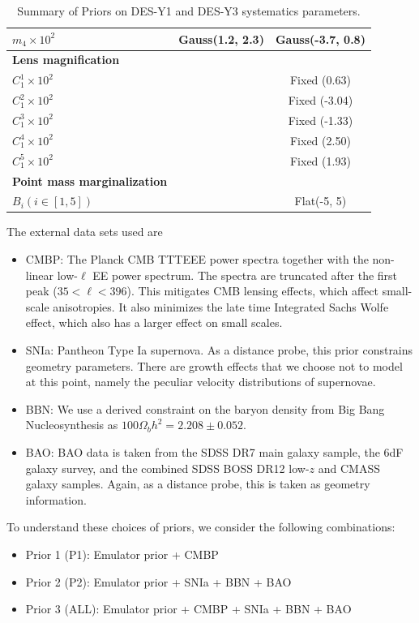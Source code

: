 \begin{table}
\begin{tabular}{lcc}
$m_{4} \times 10^2$ & Gauss(1.2, 2.3) & Gauss(-3.7, 0.8)\\
\hline
\textbf{Lens magnification} \\
$C_{\mathrm{1}}^1 \times 10^2$ & & Fixed (0.63)\\
$C_{\mathrm{1}}^2 \times 10^2$ & & Fixed (-3.04)\\
$C_{\mathrm{1}}^3 \times 10^2$ & & Fixed (-1.33)\\
$C_{\mathrm{1}}^4 \times 10^2$ & & Fixed (2.50)\\
$C_{\mathrm{1}}^5 \times 10^2$ & & Fixed (1.93)\\
\hline
\textbf{Point mass marginalization} \\
$B_i(i \in [1,5])$ & & Flat(-5, 5) \\
\hline
\end{tabular}
\caption{Summary of Priors on DES-Y1 and DES-Y3 systematics parameters.}
\label{table:prior_choices}
\end{table}
The external data sets used are
\begin{itemize}
	\item CMBP: The Planck CMB TTTEEE power spectra together with the non-linear low-$\ell$ EE power spectrum. The spectra are truncated after the first peak ($35<\ell<396$). This mitigates CMB lensing effects, which affect small-scale anisotropies. It also minimizes the late time Integrated Sachs Wolfe effect, which also has a larger effect on small scales.
	\item SNIa: Pantheon Type Ia supernova. As a distance probe, this prior constrains geometry parameters. There are growth effects that we choose not to model at this point, namely the peculiar velocity distributions of supernovae.
	\item BBN: We use a derived constraint on the baryon density from Big Bang Nucleosynthesis as $100\Omega_bh^2 = 2.208 \pm 0.052$.
	\item BAO: BAO data is taken from the SDSS DR7 main galaxy sample, the 6dF galaxy survey, and the combined SDSS BOSS DR12 low-$z$ and CMASS galaxy samples. Again, as a distance probe, this is taken as geometry information.
\end{itemize}
To understand these choices of priors, we consider the following combinations:
\begin{itemize}
	\item Prior 1 (P1): Emulator prior + CMBP
	\item Prior 2 (P2): Emulator prior + SNIa + BBN + BAO
	\item Prior 3 (ALL): Emulator prior + CMBP + SNIa + BBN + BAO
\end{itemize}
